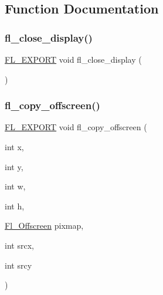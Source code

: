 \subsection{Function Documentation}
\mbox{\label{x_8_h_ade3ae56765e00bc95627ff95c63cd2d7}} 
\subsubsection{\texorpdfstring{fl\+\_\+close\+\_\+display()}{fl\_close\_display()}}
{\footnotesize\ttfamily \hyperlink{_fl___export_8_h_aa9ba29a18aee9d738370a06eeb4470fc}{F\+L\+\_\+\+E\+X\+P\+O\+RT} void fl\+\_\+close\+\_\+display (\begin{DoxyParamCaption}{ }\end{DoxyParamCaption})}

\mbox{\label{x_8_h_a14b50a64e4e79330adf03df9a827c161}} 
\subsubsection{\texorpdfstring{fl\+\_\+copy\+\_\+offscreen()}{fl\_copy\_offscreen()}}
{\footnotesize\ttfamily \hyperlink{_fl___export_8_h_aa9ba29a18aee9d738370a06eeb4470fc}{F\+L\+\_\+\+E\+X\+P\+O\+RT} void fl\+\_\+copy\+\_\+offscreen (\begin{DoxyParamCaption}\item[{int}]{x,  }\item[{int}]{y,  }\item[{int}]{w,  }\item[{int}]{h,  }\item[{\hyperlink{mac_8_h_ad24d9679e17ea5ffa910ed355d4df340}{Fl\+\_\+\+Offscreen}}]{pixmap,  }\item[{int}]{srcx,  }\item[{int}]{srcy }\end{DoxyParamCaption})}

\mbox{\label{x_8_h_ae12b3364d68f86e9e920fccc9c0b79e3}} 
